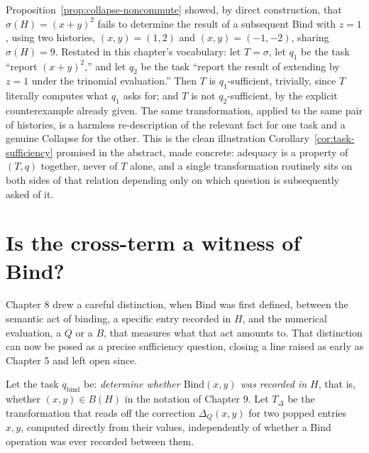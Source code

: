 \documentclass[11pt]{book}
\begin{document}
Proposition~\ref{prop:collapse-noncommute} showed, by direct construction, that $\sigma(H)=(x+y)^2$ fails to determine the result of a subsequent Bind with $z=1$, using two histories, $(x,y)=(1,2)$ and $(x,y)=(-1,-2)$, sharing $\sigma(H)=9$. Restated in this chapter's vocabulary: let $T=\sigma$, let $q_1$ be the task ``report $(x+y)^2$,'' and let $q_2$ be the task ``report the result of extending by $z=1$ under the trinomial evaluation.'' Then $T$ is $q_1$-sufficient, trivially, since $T$ literally computes what $q_1$ asks for; and $T$ is not $q_2$-sufficient, by the explicit counterexample already given. The same transformation, applied to the same pair of histories, is a harmless re-description of the relevant fact for one task and a genuine Collapse for the other. This is the clean illustration Corollary~\ref{cor:task-sufficiency} promised in the abstract, made concrete: adequacy is a property of $(T,q)$ together, never of $T$ alone, and a single transformation routinely sits on both sides of that relation depending only on which question is subsequently asked of it.

\section{Is the cross-term a witness of Bind?}

Chapter 8 drew a careful distinction, when Bind was first defined, between the semantic act of binding, a specific entry recorded in $H$, and the numerical evaluation, a $Q$ or a $B$, that measures what that act amounts to. That distinction can now be posed as a precise sufficiency question, closing a line raised as early as Chapter 5 and left open since.

Let the task $q_{\mathrm{bind}}$ be: \emph{determine whether $\mathrm{Bind}(x,y)$ was recorded in $H$}, that is, whether $(x,y)\in B(H)$ in the notation of Chapter 9. Let $T_\Delta$ be the transformation that reads off the correction $\Delta_Q(x,y)$ for two popped entries $x,y$, computed directly from their values, independently of whether a Bind operation was ever recorded between them.
\end{document}
